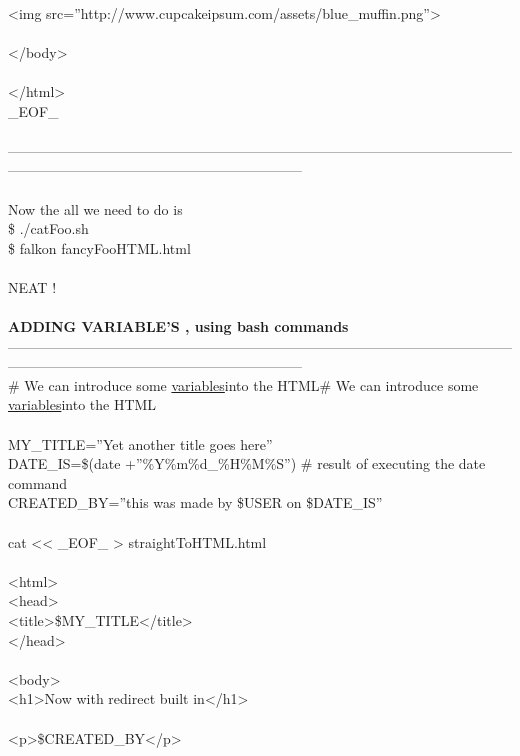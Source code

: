\documentclass[10pt,a4paper]{article}
\begin{document}
{{{{{{{{{{{{{{{{        \\
        <img src=''http://www.cupcakeipsum.com/assets/blue\_muffin.png''}{\Large  >\\
        \\
    </body>\\
\\
</html>\\
\_EOF\_\\
\\
---------------------------------------------------------------------------------------------------------------------------------------------------------------------------\\
\\
Now the all we need to do is \\
\$ ./catFoo.sh\\
\$ falkon fancyFooHTML.html\\
\\
NEAT !\\
\\
\textbf{ADDING VARIABLE'S , using bash commands}}{\Large \\
---------------------------------------------------------------------------------------------------------------------------------------------------------------------------\\
\# We can introduce some \hyperlink{variables}{variables}}{\Large  into the HTML\# We can introduce some \hyperlink{variables}{variables}}{\Large  into the HTML\\
\\
MY\_TITLE=''Yet another title goes here''\\
DATE\_IS=\$(date +''\%Y\%m\%d\_\%H\%M\%S'') \# result of executing the date command\\
CREATED\_BY=''this was made by \$USER on \$DATE\_IS''\\
\\
cat << \_EOF\_ > straightToHTML.html\\
\\
<html>\\
    <head>\\
        <title>\$MY\_TITLE</title>\\
    </head>\\
\\
    <body>\\
        <h1>Now with redirect built in</h1>\\
        \\
        <p>\$CREATED\_BY</p>\\
}}}}}}}}}}}}}}}}
\end{document}
